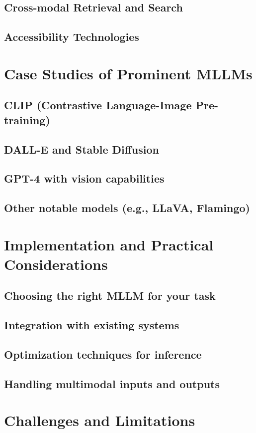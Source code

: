 \documentclass{book}
\begin{document}
\section{Cross-modal Retrieval and Search}
\section{Accessibility Technologies}

\chapter{Case Studies of Prominent MLLMs}
\section{CLIP (Contrastive Language-Image Pre-training)}
\section{DALL-E and Stable Diffusion}
\section{GPT-4 with vision capabilities}
\section{Other notable models (e.g., LLaVA, Flamingo)}

\chapter{Implementation and Practical Considerations}
\section{Choosing the right MLLM for your task}
\section{Integration with existing systems}
\section{Optimization techniques for inference}
\section{Handling multimodal inputs and outputs}

\chapter{Challenges and Limitations}
\end{document}

